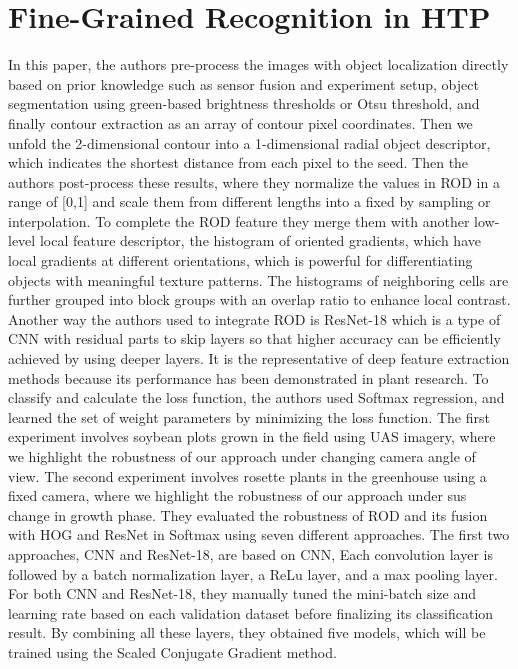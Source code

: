 \section{Fine-Grained Recognition in HTP}
In this paper, the authors pre-process the images with object localization directly based on prior knowledge such as sensor fusion and experiment setup,
object segmentation using green-based brightness thresholds or Otsu threshold, and finally contour extraction as an array of contour pixel coordinates.
Then we unfold the 2-dimensional contour into a 1-dimensional radial object descriptor, which indicates the shortest distance from each pixel to the seed.
Then the authors post-process these results, where they normalize the values in ROD in a range of [0,1] and scale them from different lengths into a fixed
by sampling or interpolation. To complete the ROD feature they merge them with another low-level local feature descriptor, the histogram of oriented gradients,
which have local gradients at different orientations, which is powerful for differentiating objects with meaningful texture patterns. The histograms of neighboring
cells are further grouped into block groups with an overlap ratio to enhance local contrast. Another way the authors used to integrate ROD is ResNet-18 which is a
type of CNN with residual parts to skip layers so that higher accuracy can be efficiently achieved by using deeper layers. It is the representative of deep feature
extraction methods because its performance has been demonstrated in plant research. To classify and calculate the loss function, the authors used Softmax regression,
and learned the set of weight parameters by minimizing the loss function. The first experiment involves soybean plots grown in the field using UAS imagery, where we
highlight the robustness of our approach under changing camera angle of view. The second experiment involves rosette plants in the greenhouse using a fixed camera,
where we highlight the robustness of our approach under sus change in growth phase. They evaluated the robustness of ROD and its fusion with HOG and ResNet in
Softmax using seven different approaches. The first two approaches, CNN and ResNet-18, are based on CNN, Each convolution layer is followed by a batch normalization
layer, a ReLu layer, and a max pooling layer. For both CNN and ResNet-18, they manually tuned the mini-batch size and learning rate based on each validation dataset
before finalizing its classification result. By combining all these layers, they obtained five models, which will be trained using the Scaled Conjugate Gradient method.
